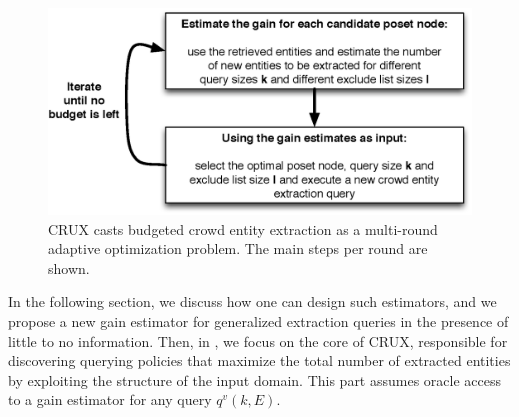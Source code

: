 \begin{figure}
	\begin{center}
	\includegraphics[clip,scale=0.43]{figs/framework.eps}
	\caption{CRUX casts budgeted crowd entity extraction as a multi-round adaptive optimization problem. The main steps per round are shown.}
	\label{fig:framework}
	\vspace{-20pt}
	\end{center}
\end{figure}

In the following section, we discuss how one can design such estimators, and we propose a new gain estimator for generalized extraction queries in the presence of little to no information. Then, in , we focus on the core of CRUX, responsible for discovering querying policies that maximize the total number of extracted entities by exploiting the structure of the input domain. This part assumes oracle access to a gain estimator for any query $q^v(k,E)$. 
